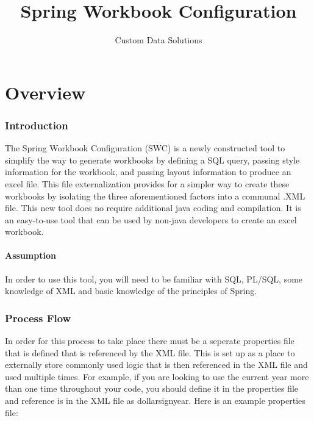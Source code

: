 \documentclass[letterpaper,10pt]{article}
\title{Spring Workbook Configuration}
\author{Custom Data Solutions}
\date{}
\begin{document}
\cfoot[]{}
\maketitle
\newpage
\tableofcontents
\raggedright
\raggedbottom

\maketitle

\newpage
\part{Overview}
\section{Introduction}
The Spring Workbook Configuration (SWC) is a newly constructed tool to simplify the way to generate workbooks by defining a SQL query, passing style information for the workbook, and passing layout information to produce an excel file.  This file externalization provides for a simpler way to create these workbooks by isolating the three aforementioned factors into a communal .XML file.  This new tool does no require additional java coding and compilation.  It is an easy-to-use tool that can be used by non-java developers to create an excel workbook.

\subsection{Assumption}
In order to use this tool, you will need to be familiar with SQL, PL/SQL, some knowledge of XML and basic knowledge of the principles of Spring.

\section{Process Flow}
In order for this process to take place there must be a seperate properties file that is defined that is referenced by the XML file.  This is set up as a place to externally store commonly used logic that is then referenced in the XML file and used multiple times.  For example, if you are looking to use the current year more than one time throughout your code, you should define it in the properties file and reference is in the XML file as dollarsign{year}.  Here is an example properties file: 
\end{document}
